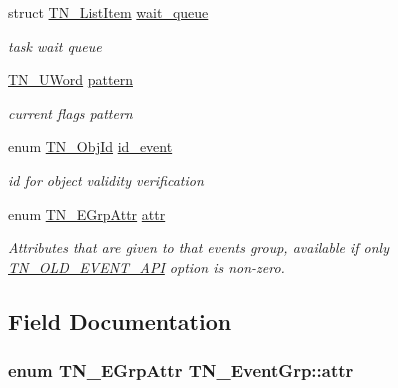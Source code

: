 \begin{DoxyCompactItemize}
\item 
\hypertarget{structTN__EventGrp_a93da04331cafe905f9c8b2fa2bad648b}{struct \hyperlink{structTN__ListItem}{T\+N\+\_\+\+List\+Item} \hyperlink{structTN__EventGrp_a93da04331cafe905f9c8b2fa2bad648b}{wait\+\_\+queue}}\label{structTN__EventGrp_a93da04331cafe905f9c8b2fa2bad648b}

\begin{DoxyCompactList}\small\item\em task wait queue \end{DoxyCompactList}\item 
\hypertarget{structTN__EventGrp_abf45ee25e11ea46636920be5003cdec2}{\hyperlink{tn__arch__example_8h_ab80cba0fe9ffcd9011d53dfeb9e39bf4}{T\+N\+\_\+\+U\+Word} \hyperlink{structTN__EventGrp_abf45ee25e11ea46636920be5003cdec2}{pattern}}\label{structTN__EventGrp_abf45ee25e11ea46636920be5003cdec2}

\begin{DoxyCompactList}\small\item\em current flags pattern \end{DoxyCompactList}\item 
\hypertarget{structTN__EventGrp_a0bdf55b6117237122efeefcdf6802d37}{enum \hyperlink{tn__common_8h_ae779dd1f6735f6e139fb70acd004d976}{T\+N\+\_\+\+Obj\+Id} \hyperlink{structTN__EventGrp_a0bdf55b6117237122efeefcdf6802d37}{id\+\_\+event}}\label{structTN__EventGrp_a0bdf55b6117237122efeefcdf6802d37}

\begin{DoxyCompactList}\small\item\em id for object validity verification \end{DoxyCompactList}\item 
enum \hyperlink{tn__eventgrp_8h_aca5ed3b60cdaa2e2db8b88f4b5e33d3f}{T\+N\+\_\+\+E\+Grp\+Attr} \hyperlink{structTN__EventGrp_ac247c74950bd8ae6f721ff220e5a2402}{attr}
\begin{DoxyCompactList}\small\item\em Attributes that are given to that events group, available if only {\ttfamily \hyperlink{tn__cfg__default_8h_ac61d5f6a716cdcab205a2c8afbde4242}{T\+N\+\_\+\+O\+L\+D\+\_\+\+E\+V\+E\+N\+T\+\_\+\+A\+P\+I}} option is non-\/zero. \end{DoxyCompactList}\end{DoxyCompactItemize}


\subsection{Field Documentation}
\hypertarget{structTN__EventGrp_ac247c74950bd8ae6f721ff220e5a2402}{
\subsubsection[{attr}]{\setlength{\rightskip}{0pt plus 5cm}enum {\bf T\+N\+\_\+\+E\+Grp\+Attr} T\+N\+\_\+\+Event\+Grp\+::attr}}\label{structTN__EventGrp_ac247c74950bd8ae6f721ff220e5a2402}


